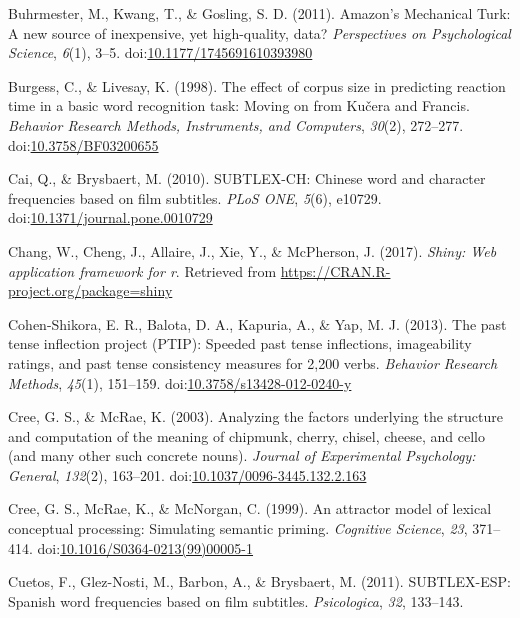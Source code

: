 \documentclass[english,,man]{apa6}
\theoremstyle{definition}
\theoremstyle{definition}
\theoremstyle{definition}
\theoremstyle{remark}
\begin{document}
\leavevmode\hypertarget{ref-Buhrmester2011}{}%
Buhrmester, M., Kwang, T., \& Gosling, S. D. (2011). Amazon's Mechanical
Turk: A new source of inexpensive, yet high-quality, data?
\emph{Perspectives on Psychological Science}, \emph{6}(1), 3--5.
doi:\href{https://doi.org/10.1177/1745691610393980}{10.1177/1745691610393980}

\leavevmode\hypertarget{ref-Burgess1998}{}%
Burgess, C., \& Livesay, K. (1998). The effect of corpus size in
predicting reaction time in a basic word recognition task: Moving on
from Kučera and Francis. \emph{Behavior Research Methods, Instruments,
and Computers}, \emph{30}(2), 272--277.
doi:\href{https://doi.org/10.3758/BF03200655}{10.3758/BF03200655}

\leavevmode\hypertarget{ref-Cai2010}{}%
Cai, Q., \& Brysbaert, M. (2010). SUBTLEX-CH: Chinese word and character
frequencies based on film subtitles. \emph{PLoS ONE}, \emph{5}(6),
e10729.
doi:\href{https://doi.org/10.1371/journal.pone.0010729}{10.1371/journal.pone.0010729}

\leavevmode\hypertarget{ref-R-shiny}{}%
Chang, W., Cheng, J., Allaire, J., Xie, Y., \& McPherson, J. (2017).
\emph{Shiny: Web application framework for r}. Retrieved from
\url{https://CRAN.R-project.org/package=shiny}

\leavevmode\hypertarget{ref-Cohen-Shikora2013}{}%
Cohen-Shikora, E. R., Balota, D. A., Kapuria, A., \& Yap, M. J. (2013).
The past tense inflection project (PTIP): Speeded past tense
inflections, imageability ratings, and past tense consistency measures
for 2,200 verbs. \emph{Behavior Research Methods}, \emph{45}(1),
151--159.
doi:\href{https://doi.org/10.3758/s13428-012-0240-y}{10.3758/s13428-012-0240-y}

\leavevmode\hypertarget{ref-Cree2003}{}%
Cree, G. S., \& McRae, K. (2003). Analyzing the factors underlying the
structure and computation of the meaning of chipmunk, cherry, chisel,
cheese, and cello (and many other such concrete nouns). \emph{Journal of
Experimental Psychology: General}, \emph{132}(2), 163--201.
doi:\href{https://doi.org/10.1037/0096-3445.132.2.163}{10.1037/0096-3445.132.2.163}

\leavevmode\hypertarget{ref-Cree1999}{}%
Cree, G. S., McRae, K., \& McNorgan, C. (1999). An attractor model of
lexical conceptual processing: Simulating semantic priming.
\emph{Cognitive Science}, \emph{23}, 371--414.
doi:\href{https://doi.org/10.1016/S0364-0213(99)00005-1}{10.1016/S0364-0213(99)00005-1}

\leavevmode\hypertarget{ref-Cuetos2011}{}%
Cuetos, F., Glez-Nosti, M., Barbon, A., \& Brysbaert, M. (2011).
SUBTLEX-ESP: Spanish word frequencies based on film subtitles.
\emph{Psicologica}, \emph{32}, 133--143.
\end{document}
